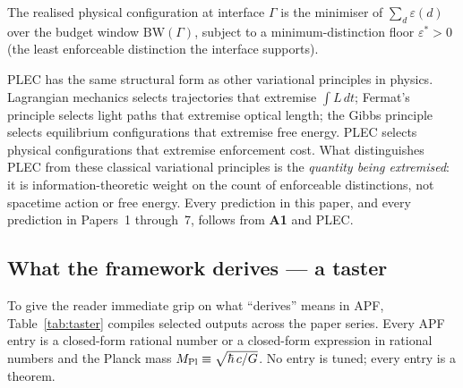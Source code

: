 \documentclass[11pt]{article}
\newcommand{\Aone}{\textbf{A1}}
\newcommand{\Mpl}{M_{\rm Pl}}
\begin{document}
\begin{tcolorbox}[apfbox, title={Principle of Least Enforcement Cost (PLEC)}]
The realised physical configuration at interface $\Gamma$ is the minimiser of $\sum_{d} \varepsilon(d)$ over the budget window $\mathrm{BW}(\Gamma)$, subject to a minimum-distinction floor $\varepsilon^* > 0$ (the least enforceable distinction the interface supports).
\end{tcolorbox}

\noindent PLEC has the same structural form as other variational principles in physics. Lagrangian mechanics selects trajectories that extremise $\int L\,dt$; Fermat's principle selects light paths that extremise optical length; the Gibbs principle selects equilibrium configurations that extremise free energy. PLEC selects physical configurations that extremise enforcement cost. What distinguishes PLEC from these classical variational principles is the \emph{quantity being extremised}: it is information-theoretic weight on the count of enforceable distinctions, not spacetime action or free energy. Every prediction in this paper, and every prediction in Papers~1 through~7, follows from \Aone{} and PLEC.

\subsection{What the framework derives --- a taster}\label{sec:intro_taster}

To give the reader immediate grip on what ``derives'' means in APF, Table~\ref{tab:taster} compiles selected outputs across the paper series. Every APF entry is a closed-form rational number or a closed-form expression in rational numbers and the Planck mass $\Mpl \equiv \sqrt{\hbar\,c/G}$. No entry is tuned; every entry is a theorem.
\end{document}
